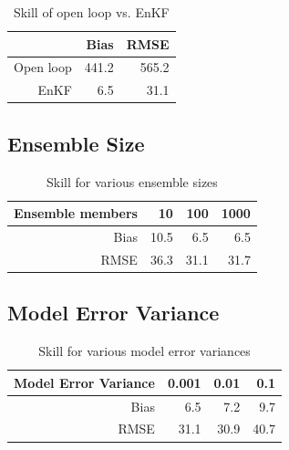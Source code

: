 \documentclass[fleqn, letterpaper]{amsart}
\begin{document}
\begin{table}
\begin{tabular}{rrr}
& Bias & RMSE \\
\hline
Open loop & 441.2 & 565.2 \\
EnKF & 6.5 & 31.1
\end{tabular}
\caption{Skill of open loop vs. EnKF}
\end{table}

\subsection{Ensemble Size}

\begin{table}
\begin{tabular}{rrrr}
Ensemble members & 10 & 100 & 1000 \\
\hline
Bias & 10.5 & 6.5 & 6.5 \\
RMSE & 36.3 & 31.1 & 31.7
\end{tabular}
\caption{Skill for various ensemble sizes}
\end{table}

\subsection{Model Error Variance}

\begin{table}
\begin{tabular}{rrrr}
Model Error Variance & 0.001 & 0.01 & 0.1 \\
\hline
Bias & 6.5 & 7.2 & 9.7\\
RMSE & 31.1 & 30.9 & 40.7
\end{tabular}
\caption{Skill for various model error variances}
\end{table}

%
%
\end{document}
